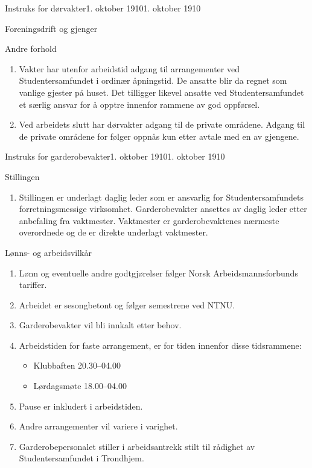 \begin{instruks}{Instruks for dørvakter}{1. oktober 1910}{1. oktober 1910}
\begin{instruksledd}{Foreningsdrift og gjenger}
\begin{enumerate}
    \begin{instruksledd}{Andre forhold}
    \begin{enumerate}
	  \item Vakter har utenfor arbeidstid adgang til arrangementer ved Studentersamfundet i ordinær åpningstid. De
ansatte blir da regnet som vanlige gjester på huset. Det tilligger likevel ansatte ved Studentersamfundet et
særlig ansvar for å opptre innenfor rammene av god oppførsel.
    \item Ved arbeidets slutt har dørvakter adgang til de private områdene. Adgang til de private områdene for følger
oppnås kun etter avtale med en av gjengene. 
    \end{enumerate}
    \end{instruksledd}

\begin{instruks}{Instruks for garderobevakter}{1. oktober 1910}{1. oktober 1910}
    \begin{instruksledd}{Stillingen}
    \begin{enumerate}
    \item Stillingen er underlagt daglig leder som er ansvarlig for Studentersamfundets forretningsmessige virksomhet.
Garderobevakter ansettes av daglig leder etter anbefaling fra vaktmester. Vaktmester er garderobevaktenes nærmeste
overordnede og de er direkte underlagt vaktmester.
    \end{enumerate}    
    \end{instruksledd}

    \begin{instruksledd}{Lønns- og arbeidsvilkår}
    \begin{enumerate}
    \item Lønn og eventuelle andre godtgjørelser følger Norsk Arbeidsmannsforbunds tariffer.
    \item Arbeidet er sesongbetont og følger semestrene ved NTNU.
    \item Garderobevakter vil bli innkalt etter behov.
    \item Arbeidstiden for faste arrangement, er for tiden innenfor disse tidsrammene:
        \begin{itemize}
	      \item Klubbaften 20.30--04.00
	      \item Lørdagsmøte 18.00--04.00
        \end{itemize}
    \item Pause er inkludert i arbeidstiden.
    \item Andre arrangementer vil variere i varighet.
    \item Garderobepersonalet stiller i arbeidsantrekk stilt til rådighet av Studentersamfundet i Trondhjem.
    \end{enumerate}    
    \end{instruksledd}


\end{instruks}
\end{enumerate}
\end{instruksledd}
\end{instruks}
